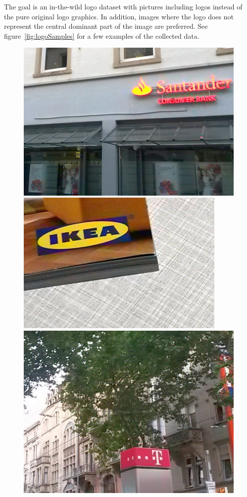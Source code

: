 \documentclass[a4paper,twoside]{article}
\newlength{\frameSize}
\begin{document}
%
The goal is an in-the-wild logo dataset with pictures including logos instead of the pure original logo graphics. In addition, images where the logo does not represent the central dominant part of the image are preferred. See figure~\ref{fig:logoSamples} for a few examples of the collected data.
%
\setlength{\frameSize}{3.7cm}
\begin{figure}%
\centering%
\includegraphics[height=\frameSize]{img/sample2.png}
\hfill
\includegraphics[height=\frameSize]{img/sample12.png}
\hfill
\includegraphics[height=\frameSize]{img/sample3.png}%

\end{figure}
\end{document}
